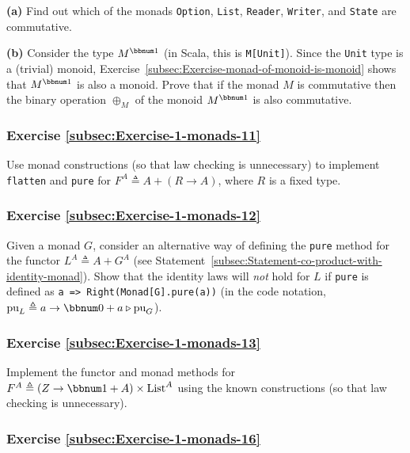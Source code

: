 \textbf{(a)} Find out which of the monads \lstinline!Option!, \lstinline!List!,
\lstinline!Reader!, \lstinline!Writer!, and \lstinline!State! are
commutative.

\textbf{(b)} Consider the type $M^{\bbnum 1}$ (in Scala, this is
\lstinline!M[Unit]!). Since the \lstinline!Unit! type is a (trivial)
monoid, Exercise~\ref{subsec:Exercise-monad-of-monoid-is-monoid}
shows that $M^{\bbnum 1}$ is also a monoid. Prove that if the monad
$M$ is commutative then the binary operation $\oplus_{M}$ of the
monoid $M^{\bbnum 1}$ is also commutative.

\subsubsection{Exercise \label{subsec:Exercise-1-monads-11}\ref{subsec:Exercise-1-monads-11}}

Use monad constructions (so that law checking is unnecessary) to implement
\lstinline!flatten! and \lstinline!pure! for $F^{A}\triangleq A+\left(R\rightarrow A\right)$,
where $R$ is a fixed type.

\subsubsection{Exercise \label{subsec:Exercise-1-monads-12}\ref{subsec:Exercise-1-monads-12}}

Given a monad $G$, consider an alternative way of defining the \lstinline!pure!
method for the functor $L^{A}\triangleq A+G^{A}$ (see Statement~\ref{subsec:Statement-co-product-with-identity-monad}).
Show that the identity laws will \emph{not} hold for $L$ if \lstinline!pure!
is defined as \lstinline!a => Right(Monad[G].pure(a))! (in the code
notation, $\text{pu}_{L}\triangleq a\rightarrow\bbnum 0+a\triangleright\text{pu}_{G}$).

\subsubsection{Exercise \label{subsec:Exercise-1-monads-13}\ref{subsec:Exercise-1-monads-13}}

Implement the functor and monad methods for $F^{A}\triangleq\left(Z\rightarrow\bbnum 1+A\right)\times\text{List}^{A}$
using the known constructions (so that law checking is unnecessary).

\subsubsection{Exercise \label{subsec:Exercise-1-monads-16}\ref{subsec:Exercise-1-monads-16}}

